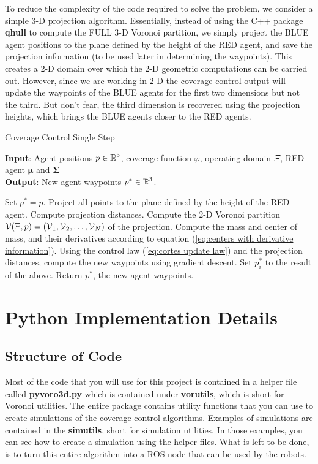\documentclass{article}
\begin{document}
To reduce the complexity of the code required to solve the problem, we consider a simple 3-D projection algorithm. Essentially, instead of using the C++ package \textbf{qhull} to compute the FULL 3-D Voronoi partition, we simply project the BLUE agent positions to the plane defined by the height of the RED agent, and save the projection information (to be used later in determining the waypoints). This creates a 2-D domain over which the 2-D geometric computations can be carried out. However, since we are working in 2-D the coverage control output will update the waypoints of the BLUE agents for the first two dimensions but not the third. But don't fear, the third dimension is recovered using the projection heights, which brings the BLUE agents closer to the RED agents. 

\begin{algorithm}[H]
	\caption{Coverage Control Single Step}
	\label{alg:coverage single step}
	\hspace*{\algorithmicindent}\textbf{Input}: Agent positions $p \in \operatorname{\mathbb{R}}^3$, coverage function $\varphi$, operating domain $\Xi$, RED agent $\boldsymbol{\mu}$ and $\boldsymbol{\Sigma}$ \\
	\hspace*{\algorithmicindent}\textbf{Output}: New agent waypoints $p^* \in \operatorname{\mathbb{R}}^3$.
	\begin{algorithmic}
		\STATE Set $p^*  = p$.
		\STATE Project all points to the plane defined by the height of the RED agent. 
		\STATE Compute projection distances.
		\STATE Compute the 2-D Voronoi partition $\operatorname{\mathcal{V}}(\Xi, p) = (\operatorname{\mathcal{V}}_1, \operatorname{\mathcal{V}}_2, \dots, \operatorname{\mathcal{V}}_N)$ of the projection.
			\STATE Compute the mass and center of mass, and their derivatives according to equation (\ref{eq:centers with derivative information}).
			\STATE Using the control law (\ref{eq:cortes update law}) and the projection distances, compute the new waypoints using gradient descent.
			\STATE Set $p^*_i$ to the result of the above.
		\ENDFOR
		\STATE Return $p^*$, the new agent waypoints.
	\end{algorithmic}
\end{algorithm}

\section{Python Implementation Details}
\subsection{Structure of Code}
Most of the code that you will use for this project is contained in a helper file called \textbf{pyvoro3d.py} which is contained under \textbf{vorutils}, which is short for Voronoi utilities. The entire package contains utility functions that you can use to create simulations of the coverage control algorithms. Examples of simulations are contained in the \textbf{simutils}, short for simulation utilities. In those examples, you can see how to create a simulation using the helper files. What is left to be done, is to turn this entire algorithm into a ROS node that can be used by the robots. 
\end{document}
